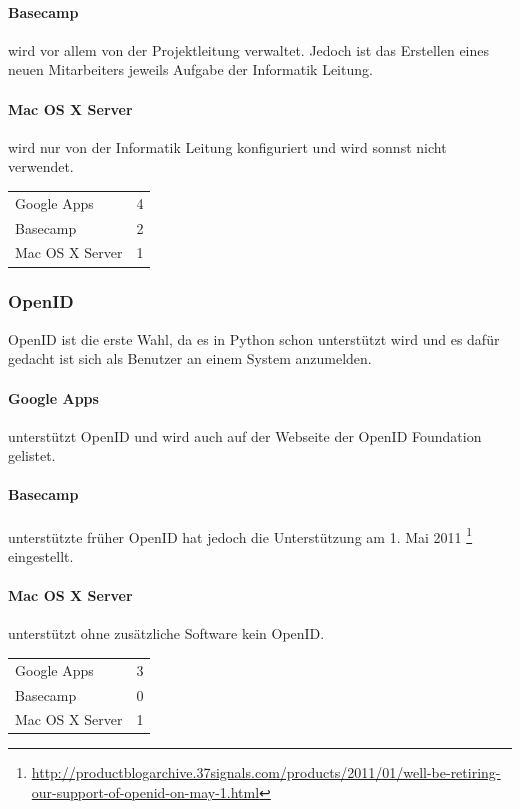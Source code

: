 \paragraph{Basecamp}
\label{par:1.3Basecamp}
wird vor allem von der Projektleitung verwaltet. Jedoch ist das Erstellen eines neuen Mitarbeiters jeweils Aufgabe der Informatik Leitung.
\paragraph{Mac OS X Server}
\label{par:1.3Mac OS X Server}
wird nur von der Informatik Leitung konfiguriert und wird sonnst nicht verwendet.

\begin{tabular}{lc}
Google Apps & 4\\
Basecamp & 2\\
Mac OS X Server & 1\\
\end{tabular}

\subsubsection{OpenID}
\label{ssub:Bewertung OpenID}
OpenID ist die erste Wahl, da es in Python schon unterstützt wird und es dafür gedacht ist sich als Benutzer an einem System anzumelden.
\paragraph{Google Apps}
\label{par:2.1Google Apps}
unterstützt OpenID und wird auch auf der Webseite der OpenID Foundation gelistet.
\paragraph{Basecamp}
\label{par:2.1Basecamp}
unterstützte früher OpenID hat jedoch die Unterstützung am 1. Mai 2011 \footnote{\url{http://productblogarchive.37signals.com/products/2011/01/well-be-retiring-our-support-of-openid-on-may-1.html}} eingestellt.
\paragraph{Mac OS X Server}
\label{par:2.1Mac OS X Server}
unterstützt ohne zusätzliche Software kein OpenID.

\begin{tabular}{lc}
Google Apps & 3\\
Basecamp & 0\\
Mac OS X Server & 1\\
\end{tabular}

